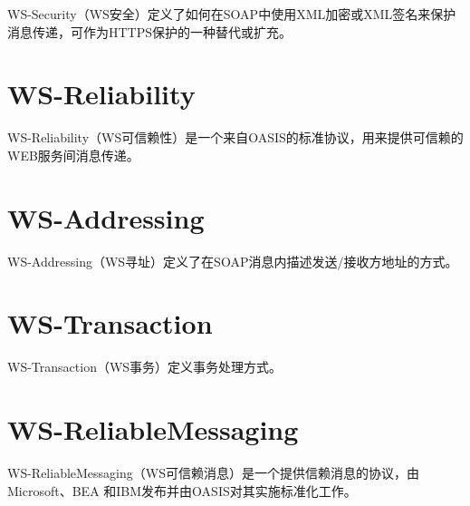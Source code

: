 WS-Security（WS安全）定义了如何在SOAP中使用XML加密或XML签名来保护消息传递，可作为HTTPS保护的一种替代或扩充。

\section{WS-Reliability}

WS-Reliability（WS可信赖性）是一个来自OASIS的标准协议，用来提供可信赖的WEB服务间消息传递。




\section{WS-Addressing}

WS-Addressing（WS寻址）定义了在SOAP消息内描述发送/接收方地址的方式。

\section{WS-Transaction}


WS-Transaction（WS事务）定义事务处理方式。


\section{WS-ReliableMessaging}

WS-ReliableMessaging（WS可信赖消息）是一个提供信赖消息的协议，由Microsoft、BEA 和IBM发布并由OASIS对其实施标准化工作。




